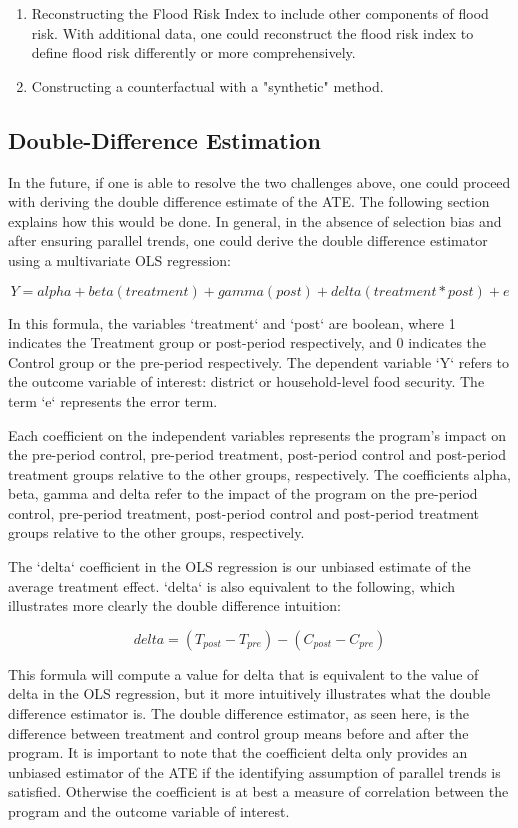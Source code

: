 \begin{enumerate}
  \item Reconstructing the Flood Risk Index to include other components of flood risk. With additional data, one could reconstruct the flood risk index to define flood risk differently or more comprehensively.
  \item Constructing a counterfactual with a "synthetic" method.
\end{enumerate}

\subsection{Double-Difference Estimation}

In the future, if one is able to resolve the two challenges above, one could proceed with deriving the double difference estimate of the ATE. The following section explains how this would be done. In general, in the absence of selection bias and after ensuring parallel trends, one could derive the double difference estimator using a multivariate OLS regression:

\[ Y = alpha + beta (treatment) + gamma (post) + delta (treatment * post) + e \]

In this formula, the variables `treatment` and `post` are boolean, where 1 indicates the Treatment group or post-period respectively, and 0 indicates the Control group or the pre-period respectively. The dependent variable `Y` refers to the outcome variable of interest: district or household-level food security. The term `e` represents the error term.

Each coefficient on the independent variables represents the program’s impact on the pre-period control, pre-period treatment, post-period control and post-period treatment groups relative to the other groups, respectively. The coefficients alpha, beta, gamma and delta refer to the impact of the program on the pre-period control, pre-period treatment, post-period control and post-period treatment groups relative to the other groups, respectively. 

The `delta` coefficient in the OLS regression is our unbiased estimate of the average treatment effect. `delta` is also equivalent to the following, which illustrates more clearly the double difference intuition:

\[ delta = (T_{post} - T_{pre}) - (C_{post} - C_{pre}) \]

This formula will compute a value for delta that is equivalent to the value of delta in the OLS regression, but it more intuitively illustrates what the double difference estimator is. The double difference estimator, as seen here, is the difference between treatment and control group means before and after the program. It is important to note that the coefficient delta only provides an unbiased estimator of the ATE if the identifying assumption of parallel trends is satisfied. Otherwise the coefficient is at best a measure of correlation between the program and the outcome variable of interest.
